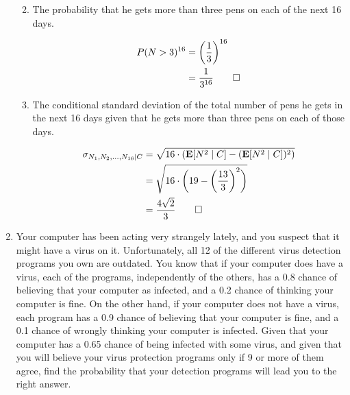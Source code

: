\documentclass[paper=usletter, fontsize=12pt]{article}
\begin{document}
\begin{enumerate}
\begin{enumerate}
\begin{cproof}
            \end{cproof}

            \item The probability that he gets more than three pens on each of
            the next 16 days.
            \begin{cproof}
                \begin{align*}
                    P(N > 3)^{16} & = \bigg(\frac{1}{3}\bigg)^{16}\\
                    & = \frac{1}{3^{16}} \qedhere
                \end{align*}
                \endgroup
            \end{cproof}

            \item The conditional standard deviation of the total number of
            pens he gets in the next 16 days given that he gets more than three
            pens on each of those days.
            \begin{cproof}

                \begin{align*}
                    \sigma_{N_1,N_2,\ldots,N_{16} \mid C} &= \sqrt{16\cdot(\textbf{E}[N^2 \mid C]-(\textbf{E}[N^2 \mid C])^2)} \\
                    & = \sqrt{16\cdot\bigg(19-\bigg(\frac{13}{3}\bigg)^2\bigg)}\\
                    & = \frac{4\sqrt{2}}{3} \qedhere
                \end{align*}
                \endgroup

            \end{cproof}

        \end{enumerate}

        \item Your computer has been acting very strangely lately, and you
        suspect that it might have a virus on it. Unfortunately, all 12 of the
        different virus detection programs you own are outdated. You know that
        if your computer does have a virus, each of the programs, independently
        of the others, has a 0.8 chance of believing that your computer as
        infected, and a 0.2 chance of thinking your computer is fine. On the
        other hand, if your computer does not have a virus, each program has a
        0.9 chance of believing that your computer is fine, and a 0.1 chance of
        wrongly thinking your computer is infected. Given that your computer
        has a 0.65 chance of being infected with some virus, and given that you
        will believe your virus protection programs only if 9 or more of them
        agree, find the probability that your detection programs will lead you
        to the right answer.
        \begin{cproof}
        \end{cproof}


\end{enumerate}
\end{document}
